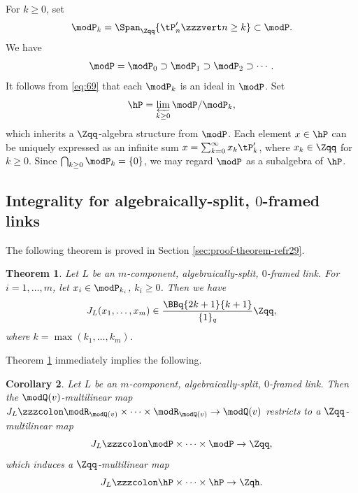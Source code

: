 \documentclass{amsart}
\numberwithin{equation}{section}
\numberwithin{figure}{section}
\theoremstyle{plain}
\newtheorem{theorem}{Theorem}[section]
\newtheorem{corollary}[theorem]{Corollary}
\theoremstyle{definition}
\theoremstyle{remark}
\begin{document}
For $k\ge 0$, set
\begin{equation*}
  \modP _k = \Span_{\Zqq}\{\tP'_n\zzzvert n\ge k\}\subset \modP .
\end{equation*}
We have
\begin{equation*}
  \modP =\modP _0\supset \modP _1\supset \modP _2\supset \cdots.
\end{equation*}
It follows from \eqref{eq:69} that each $\modP _k$ is an ideal in $\modP $.
Set
\begin{equation*}
  \hP = \varprojlim_{k\ge 0} \modP /\modP _k,
\end{equation*}
which inherits a $\Zqq$-algebra structure from $\modP $.  Each element
$x\in \hP$ can be uniquely expressed as an infinite sum $x=\sum_{k=0}^\infty 
x_k\tP'_k$, where $x_k\in \Zqq$ for $k\ge 0$.  Since
$\bigcap_{k\ge 0}\modP _k=\{0\}$, we may regard $\modP $ as a subalgebra of
$\hP$.

\subsection{Integrality for algebraically-split, $0$-framed links}
\label{sec:maps-jlhphphaq}
The following theorem is proved in Section
\ref{sec:proof-theorem-refr29}.

\begin{theorem}
  \label{r29}
  Let $L$ be an $m$-component, algebraically-split, $0$-framed link.
  For $i=1,\ldots,m$, let $x_i\in \modP _{k_i}$, $k_i\ge 0$.  Then we have
  \begin{equation*}
    J_L(x_1,\ldots,x_m) \in \frac{\BBq{2k+1}{k+1}}{\{1\}_q}\Zqq,
  \end{equation*}
  where $k=\max(k_1,\ldots,k_m)$.
\end{theorem}

Theorem \ref{r29} immediately implies the following.

\begin{corollary}
  \label{r87}
  Let $L$ be an $m$-component, algebraically-split, $0$-framed link.
  Then the $\modQ (v)$-multilinear map
  $J_L\zzzcolon \modR _{\modQ (v)}\times \cdots\times \modR _{\modQ (v)}\rightarrow \modQ (v)$ restricts to a
  $\Zqq$-multilinear map
  \begin{equation*}
    J_L\zzzcolon \modP \times \cdots\times \modP \rightarrow \Zqq,
  \end{equation*}
  which induces a $\Zqq$-multilinear map
  \begin{equation*}
    J_L\zzzcolon \hP\times \cdots\times \hP\rightarrow \Zqh.
  \end{equation*}
\end{corollary}
\end{document}
